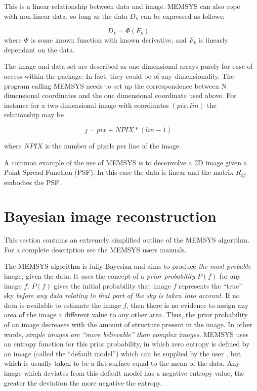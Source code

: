 This is a linear relationship between data and image. MEMSYS can also cope
with non-linear data, so long as the data $D_{k}$ can be expressed as follows:

\begin {equation}
D_{k} = \Phi(F_{k})
\end {equation}
 where $\Phi$ is some known function with known derivative, and $F_{k}$ is 
linearly dependant on the data. 

The image and data set are described as one dimensional arrays purely for ease 
of access within the package. In fact, they could be of any dimensionality. The
program calling MEMSYS needs to set up the correspondence between N dimensional 
coordinates and the one dimensional coordinate used above. For instance for a 
two dimensional image with coordinates $(pix,lin)$ the relationship may be

\begin {equation}
 j = pix + NPIX*(lin-1)
\end {equation}

where $NPIX$ is the number of pixels per line of the image.

A common example of the use of MEMSYS is to deconvolve a 2D image given a Point 
Spread Function (PSF). In this case the data is linear and the matrix $R_{kj}$ 
embodies the PSF.

\section {Bayesian image reconstruction}
\label {SEC:ENTROPY}
This section contains an extremely simplified outline of the MEMSYS algorithm.
For a complete description see the MEMSYS users manuals.

The MEMSYS algorithm is fully Bayesian and aims to produce {\em the most
probable} image, given the data. It uses the concept of a {\em prior
probability} $P(f)$ for any image $f$. $P(f)$ gives the initial probability
that image $f$ represents the ``true'' sky {\em before any data relating to
that part of the sky is taken into account}. If no data is available to
estimate the image $f$, then there is no evidence to assign any area of the
image a different value to any other area. Thus, the prior probability of an
image decreases with the amount of structure present in the image. In other
words, {\em simple images are ``more believable'' than complex images}. MEMSYS
uses an entropy function for this prior probability, in which zero entropy is
defined by an image (called the ``default model'') which can be supplied by the
user , but which is usually taken to be a flat surface equal to the mean of the
data. Any image which deviates from this default model has a negative entropy
value, the greater the deviation the more negative the entropy. 

